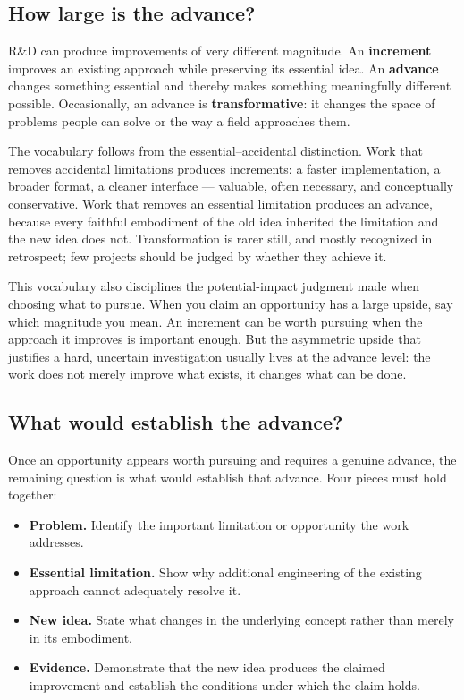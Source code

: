 \subsection{How large is the advance?}\label{sec-how-large}

R\&D can produce improvements of very different magnitude. An \textbf{increment} improves an existing
approach while preserving its essential idea. An \textbf{advance} changes something essential and
thereby makes something meaningfully different possible. Occasionally, an advance is
\textbf{transformative}: it changes the space of problems people can solve or the way a field approaches
them.

The vocabulary follows from the essential--accidental distinction. Work that removes accidental
limitations produces increments: a faster implementation, a broader format, a cleaner interface ---
valuable, often necessary, and conceptually conservative. Work that removes an essential limitation
produces an advance, because every faithful embodiment of the old idea inherited the limitation and
the new idea does not. Transformation is rarer still, and mostly recognized in retrospect; few
projects should be judged by whether they achieve it.

This vocabulary also disciplines the potential-impact judgment made when choosing what to pursue.
When you claim an opportunity has a large upside, say which magnitude you mean. An increment can be
worth pursuing when the approach it improves is important enough. But the asymmetric upside that
justifies a hard, uncertain investigation usually lives at the advance level: the work does not
merely improve what exists, it changes what can be done.

\subsection{What would establish the advance?}\label{sec-establish}

Once an opportunity appears worth pursuing and requires a genuine advance, the remaining question
is what would establish that advance. Four pieces must hold together:

\begin{itemize}
\tightlist
\item
  \textbf{Problem.} Identify the important limitation or opportunity the work addresses.
\item
  \textbf{Essential limitation.} Show why additional engineering of the existing approach cannot
  adequately resolve it.
\item
  \textbf{New idea.} State what changes in the underlying concept rather than merely in its embodiment.
\item
  \textbf{Evidence.} Demonstrate that the new idea produces the claimed improvement and establish the
  conditions under which the claim holds.
\end{itemize}

